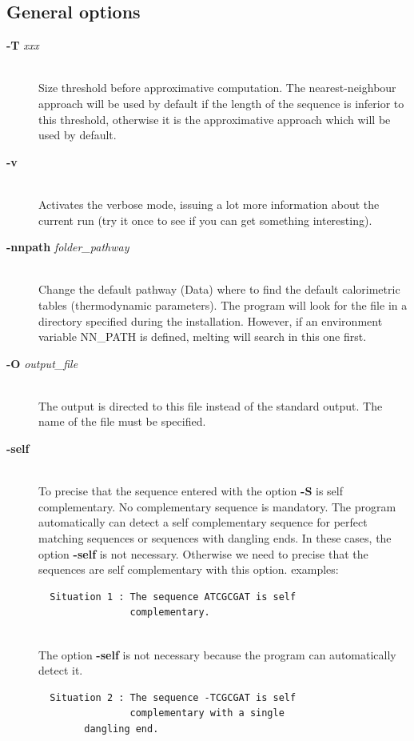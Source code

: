 \documentclass{article}
\begin{document}
\subsection{General options}
\begin{description}

\item [\textbf{-T} \textit{xxx}  ]\mbox{}\\ 
Size threshold before approximative computation. The nearest-neighbour approach 
will be used by default if the length of the sequence is inferior to this threshold,
otherwise it is the approximative approach which will be used by default.
\item [\textbf{-v}]\mbox{}\\ 
Activates the verbose mode, issuing a lot more information about the current run  (try it once 
to see if you can get something interesting).
\item [\textbf{-nnpath} \textit{folder\_pathway}]\mbox{}\\ 
  Change the default pathway (Data) where to find the default calorimetric tables (thermodynamic parameters).
  The program will look for the file in a directory specified during the installation.
  However, if an environment variable NN\_PATH is defined, melting will search in this one first.
\item [\textbf{-O} \textit{output\_file}]\mbox{}\\ 
  The output is directed to this file instead of the standard output. The name of the file must be specified.
\item [\textbf{-self}]\mbox{}\\
  To precise that the sequence entered with the option \textbf{-S} is self complementary. No complementary sequence is mandatory. 
  The program automatically can detect a self complementary sequence for perfect matching sequences or sequences with dangling ends. 
  In these cases, the option \textbf{-self} is not necessary. Otherwise we need to precise that the sequences are self complementary with this option. 
  examples: 
    
  \begin{verbatim}
  Situation 1 : The sequence ATCGCGAT is self 
                complementary. 
      
  \end{verbatim}
  
  The option \textbf{-self} is not necessary because the program can automatically detect it.
  
  \begin{verbatim}
  Situation 2 : The sequence -TCGCGAT is self 
                complementary with a single 
		dangling end. 
      

\end{verbatim}
\end{description}
\end{document}
